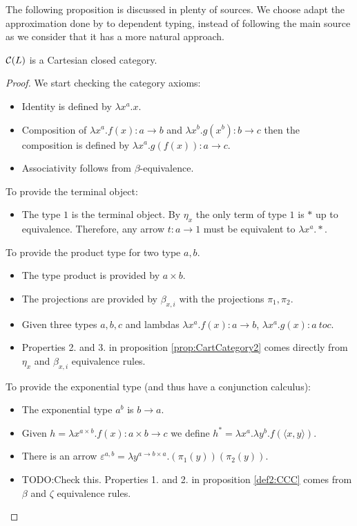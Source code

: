 \begin{definition}
The following proposition is discussed in plenty of sources. We choose adapt the approximation done by \cite{seely1984locally} to dependent typing, instead of following the main source \cite{lambek1985cartesian} as we consider that it has a more natural approach.
\begin{proposition}
  $\mathcal{C} (L)$ is a Cartesian closed category. 
\end{proposition}
\begin{proof}
  We start checking the category axioms:
  \begin{itemize}
  \item Identity is defined by $\lambda x^a.x$.
  \item Composition of $\lambda x^a. f(x):  a\to b$ and $\lambda x^b. g(x^b): b \to c$ then the composition is defined by $\lambda x^a. g(f(x)): a \to c$.
  \item Associativity follows from $\beta$-equivalence.\\
  \end{itemize}
  To provide the terminal object:
  \begin{itemize}
  \item The type $1$ is the terminal object. By $\eta_x$ the only term of type $1$ is $*$ up to equivalence. Therefore, any arrow $t:a \to 1$ must be equivalent to $\lambda x^a. *$.\\
  \end{itemize}
  To provide the product type for two type $a,b$.
  \begin{itemize}
  \item The type product is provided by $a \times b$.
  \item The projections are provided by $\beta_{x,i}$ with the projections $\pi_1,\pi_2$.
  \item Given three types $a,b,c$ and lambdas $\lambda x^a. f(x) : a\to b$, $\lambda x^a. g(x) : a\ to c$.
  \item Properties 2. and 3. in proposition \ref{prop:CartCategory2} comes directly from $\eta_x$ and $\beta_{x,i}$ equivalence rules.\\
  \end{itemize}
  To provide the exponential type (and thus have a conjunction calculus):
  \begin{itemize}
  \item The exponential type $a^b$ is $b\to a$.
  \item Given $h = \lambda x^{a\times b}. f(x): a\times b \to c$  we define $h^* = \lambda x^a. \lambda y^b. f(\langle x,y\rangle)$.
  \item There is an arrow $\varepsilon^{a,b} = \lambda y^{a\to b \times a}. (\pi_1(y))(\pi_2(y))$.
  \item TODO:Check this. Properties 1. and 2. in proposition \ref{def2:CCC} comes from $\beta$ and $\zeta$ equivalence rules.
  \end{itemize}
\end{proof}


\end{definition}
